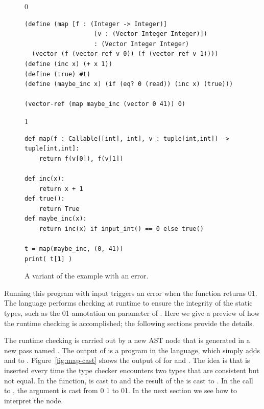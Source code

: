 \documentclass[7x10]{TimesAPriori_MIT}%
\def\racketEd{0}
\def\pythonEd{1}
\def\edition{1}
\newcommand{\racket}[1]{{\if\edition\racketEd{#1}\fi}}
\newcommand{\pythonColor}[0]{}
\newcommand{\python}[1]{{\if\edition\pythonEd\pythonColor #1\fi}}
\numberwithin{theorem}{chapter}
\numberwithin{definition}{chapter}
\numberwithin{equation}{chapter}
\begin{document}
\begin{figure}[tbp]
\begin{tcolorbox}[colback=white]  
{\if\edition\racketEd    
\begin{lstlisting}
(define (map [f : (Integer -> Integer)]
                   [v : (Vector Integer Integer)])
                   : (Vector Integer Integer)
  (vector (f (vector-ref v 0)) (f (vector-ref v 1))))
(define (inc x) (+ x 1))
(define (true) #t)
(define (maybe_inc x) (if (eq? 0 (read)) (inc x) (true)))

(vector-ref (map maybe_inc (vector 0 41)) 0)
\end{lstlisting}
\fi}
{\if\edition\pythonEd\pythonColor    
\begin{lstlisting}
def map(f : Callable[[int], int], v : tuple[int,int]) -> tuple[int,int]:
    return f(v[0]), f(v[1])

def inc(x):
    return x + 1
def true():
    return True
def maybe_inc(x):
    return inc(x) if input_int() == 0 else true()

t = map(maybe_inc, (0, 41))
print( t[1] )
\end{lstlisting}
\fi}
\end{tcolorbox}

\caption{A variant of the  example with an error.}
\label{fig:map-maybe_inc}
\end{figure}

Running this program with input  triggers an
error when the  function returns
\racket{}\python{}.  The \LangGrad{} language
performs checking at runtime to ensure the integrity of the static
types, such as the
\racket{}\python{}
annotation on
parameter  of .
Here we give a preview of how the runtime checking is accomplished;
the following sections provide the details.

The runtime checking is carried out by a new  AST node that
is generated in a new pass named .  The output of
 is a program in the \LangCast{} language, which
simply adds  and \CANYTY{} to \LangLam{}.
%
Figure~\ref{fig:map-cast} shows the output of  for
 and .  The idea is that  is
inserted every time the type checker encounters two types that are
consistent but not equal. In the  function,  is
cast to \INTTY{} and the result of the \code{+} is cast to
\CANYTY{}.  In the call to , the  argument
is cast from
\racket{}
\python{}
to 
\racket{}\python{}.
%
In the next section we see how to interpret the  node.
\end{document}
